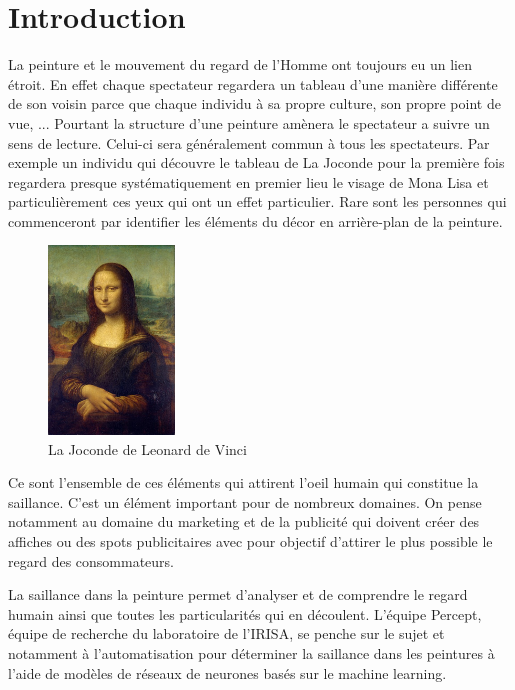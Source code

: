 \chapter{Introduction}


\par
La peinture et le mouvement du regard de l'Homme ont toujours eu un lien étroit. En effet chaque spectateur regardera un tableau d'une manière différente de son voisin parce que chaque individu à sa propre culture, son propre point de vue, ... Pourtant la structure d'une peinture amènera le spectateur a suivre un sens de lecture. Celui-ci sera généralement commun à tous les spectateurs. Par exemple un individu qui découvre le tableau de La Joconde pour la première fois regardera presque systématiquement en premier lieu le visage de Mona Lisa et particulièrement ces yeux qui ont un effet particulier. Rare sont les personnes qui commenceront par identifier les éléments du décor en arrière-plan de la peinture.

\begin{figure}[h]
    \centering
    \includegraphics[width=0.3\textwidth]
                    {datas/Mona_Lisa_by_Leonardo_da_Vinci.jpg}
    \caption{La Joconde de Leonard de Vinci}
\end{figure}

\par
Ce sont l'ensemble de ces éléments qui attirent l'oeil humain qui constitue la saillance. C'est un élément important pour de nombreux domaines. On pense notamment au domaine du marketing et de la publicité qui doivent créer des affiches ou des spots publicitaires avec pour objectif d'attirer le plus possible le regard des consommateurs.

\par
La saillance dans la peinture permet d'analyser et de comprendre le regard humain ainsi que toutes les particularités qui en découlent. L'équipe Percept, équipe de recherche du laboratoire de l'IRISA, se penche sur le sujet et notamment à l'automatisation pour déterminer la saillance dans les peintures à l'aide de modèles de réseaux de neurones basés sur le machine learning.

